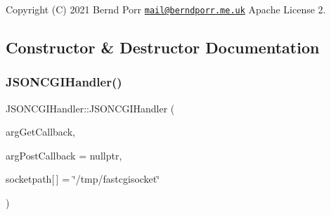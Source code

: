 Copyright (C) 2021 Bernd Porr \href{mailto:mail@berndporr.me.uk}{\tt mail@berndporr.\+me.\+uk} Apache License 2. 

\subsection{Constructor \& Destructor Documentation}
\mbox{\label{classJSONCGIHandler_a9bf5a96d13949d363225561ba6ac3b56}} 
\subsubsection{\texorpdfstring{J\+S\+O\+N\+C\+G\+I\+Handler()}{JSONCGIHandler()}}
{\footnotesize\ttfamily J\+S\+O\+N\+C\+G\+I\+Handler\+::\+J\+S\+O\+N\+C\+G\+I\+Handler (\begin{DoxyParamCaption}\item[{\hyperlink{classJSONCGIHandler_1_1GETCallback}{G\+E\+T\+Callback} $\ast$}]{arg\+Get\+Callback,  }\item[{\hyperlink{classJSONCGIHandler_1_1POSTCallback}{P\+O\+S\+T\+Callback} $\ast$}]{arg\+Post\+Callback = {\ttfamily nullptr},  }\item[{const char}]{socketpath\mbox{[}$\,$\mbox{]} = {\ttfamily \char`\"{}/tmp/fastcgisocket\char`\"{}} }\end{DoxyParamCaption})\hspace{0.3cm}{\ttfamily [inline]}}

